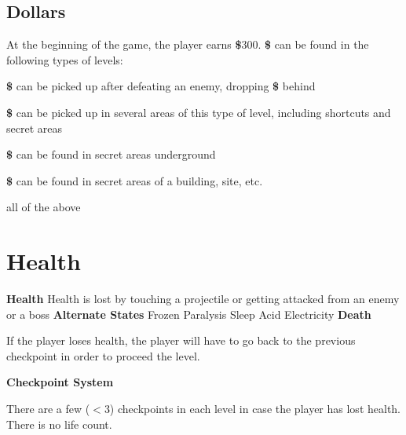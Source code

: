 \documentclass[12pt]{article}
\begin{document}
\subsection{Dollars}
\noindent At the beginning of the game, the player earns \textbf{\$}300. \textbf{\$} can be found in the following types of levels:
\begin{description}[align=right,labelwidth=3cm,noitemsep]
\item [Fight Level:] \textbf{\$} can be picked up after defeating an enemy, dropping \textbf{\$} behind
\item [Platform Level:] \textbf{\$} can be picked up in several areas of this type of level, including shortcuts and secret areas
\item [Dig Level:] \textbf{\$} can be found in secret areas underground
\item [Stealth Level:] \textbf{\$} can be found in secret areas of a building, site, etc.
\item [Combo Level:] all of the above
\end{description}
\vfill

\section{Health}
\noindent \textbf{Health} \newline
\indent Health is lost by touching a projectile or getting attacked from an enemy or a boss \newline
\noindent \textbf{Alternate States} \newline
\indent Frozen \newline
\indent Paralysis \newline
\indent\indent Sleep \newline
\indent\indent Acid \newline
\indent\indent Electricity \newline
\noindent \textbf{Death}
\begin{addmargin}[5mm]{0em}
If the player loses health, the player will have to go back to the previous checkpoint in order to proceed the level.
\end{addmargin}
\noindent \textbf{Checkpoint System}
\begin{addmargin}[5mm]{0em}
There are a few ($<$3) checkpoints in each level in case the player has lost health. There is no life count.
\end{addmargin}
\newpage
\end{document}
